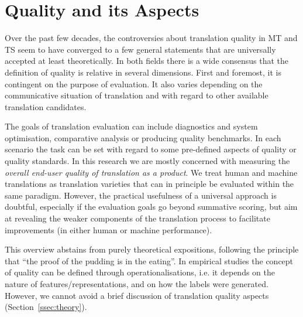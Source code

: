 \section{\label{sec:aspects}Quality and its Aspects}

Over the past few decades, the controversies about translation quality in MT and TS seem to have converged to a few general statements that are universally accepted at least theoretically.
In both fields there is a wide consensus that the definition of quality is relative in several dimensions. First and foremost, it is contingent on the purpose of evaluation. It also varies depending on the communicative situation of translation and with regard to other available translation candidates. 

The goals of translation evaluation can include diagnostics and system optimisation, comparative analysis or producing quality benchmarks. In each scenario the task can be set with regard to some pre-defined aspects of quality or quality standards. In this research we are mostly concerned with measuring the \textit{overall end-user quality of translation as a product}. We treat human and machine translations as translation varieties that can in principle be evaluated within the same paradigm. However, the practical usefulness of a universal approach is doubtful, especially if the evaluation goals go beyond summative scoring, but aim at revealing the weaker components of the translation process to facilitate improvements (in either human or machine performance).
 
This overview abstains from purely theoretical expositions, following the principle that ``the proof of the pudding is in the eating''. In empirical studies the concept of quality can be defined through operationalisations, i.e. it depends on the nature of features/representations, and on how the labels were generated. However, we cannot avoid a brief discussion of translation quality aspects
(Section~\ref{ssec:theory}).

